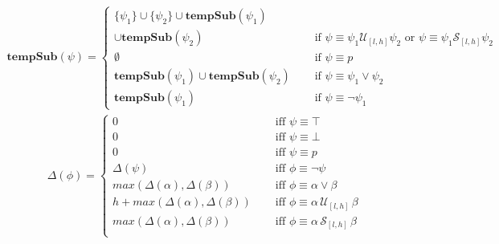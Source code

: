 \documentclass[10pt,a4paper]{article}
\begin{document}
\begin{align*}
\mathbf{tempSub}(\psi) = \left\lbrace
\begin{aligned}
\{\psi_1\} \cup \{\psi_2\} \cup \mathbf{tempSub}(\psi_1) \\
\cup \mathbf{tempSub}(\psi_2) & \quad \text{ if } \psi \equiv \psi_1 \mathcal{U}_{[l,h]} \psi_2 \text{ or } \psi \equiv \psi_1 \mathcal{S}_{[l,h]} \psi_2 \\
\emptyset & \quad \text{ if } \psi \equiv p \\
\mathbf{tempSub}(\psi_1) \cup \mathbf{tempSub}(\psi_2) & \quad \text{ if } \psi \equiv \psi_1 \vee \psi_2 \\
\mathbf{tempSub}(\psi_1) & \quad \text{ if } \psi \equiv \neg \psi_1
\end{aligned} \right.
\end{align*}
\begin{align*}
\Delta(\phi) = \left\lbrace
\begin{aligned}
0 & \quad \text{ iff } \psi \equiv \top \\
0 & \quad \text{ iff } \psi \equiv \bot \\
0 & \quad \text{ iff } \psi \equiv p \\
\Delta(\psi) & \quad \text{ iff } \phi \equiv \neg \psi \\
max(\Delta(\alpha),\Delta(\beta)) & \quad \text{ iff } \phi \equiv \alpha \vee \beta \\
h + max(\Delta(\alpha),\Delta(\beta)) & \quad \text{ iff } \phi \equiv \alpha\, \mathcal{U}_{[l,h]}\, \beta \\
max(\Delta(\alpha),\Delta(\beta)) & \quad \text{ iff } \phi \equiv \alpha\, \mathcal{S}_{[l,h]}\, \beta \\
\end{aligned} \right. 
\end{align*}
\end{document}
